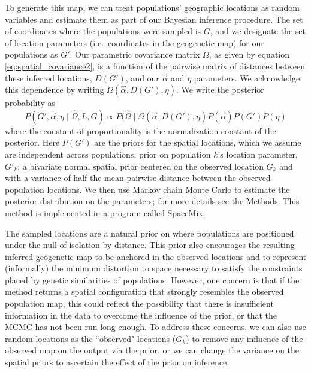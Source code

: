 \documentclass[12pt]{article}
\newcommand{\plrm}[1]{\todo[color=green!20]{#1}}
\newcommand{\plrm}[1]{\plr{#1}}
\newcommand{\plr}[1]{{\it\color{green}{(#1)}}}
\begin{document}
To generate this map, we can treat populations' geographic locations as random variables and estimate them as part of our Bayesian inference procedure.  The set of coordinates where the populations were sampled is $G$, and we designate the set of location parameters (i.e.\ coordinates in the geogenetic map) for our populations as $G'$. Our parametric covariance matrix $\Omega$, as given by equation \eqref{eq:spatial_covariance2}, is a function of the pairwise matrix of distances between these inferred locations, $D(G')$, and our $\vec{\alpha}$ and $\eta$ parameters.  We acknowledge this dependence by writing $\Omega(\vec{\alpha},{D}(G'),\eta)$.  We write the  posterior probability as 
\begin{equation}
\label{eq:cyol_prob}
P(G', \vec{\alpha}, \eta \mid \widehat{\Omega}, L, G) \propto  P(\widehat{\Omega}  \mid \Omega(\vec{\alpha},{D}(G'),\eta ) P(\vec{\alpha}) P(G') P(\eta) 
\end{equation}
where the constant of proportionality is the normalization constant of the posterior. Here $P(G') $ are the priors for the spatial locations,\plrm{distinguish from actual locations} which we assume are independent across populations.  \plr{We use a very weak} prior on population $k$'s location parameter, $G'_k$: a bivariate normal spatial prior centered on the observed location $G_k$ and with a variance of half the mean pairwise distance between the observed population locations. 
We then use Markov chain Monte Carlo to estimate the posterior distribution on the parameters; for more details see the Methods. 
This method is implemented in a program called SpaceMix. \plr{can we insert space-age sound effects whenever this name appears?}


The sampled locations are a natural prior on where populations are positioned under the null of isolation by distance.  %
This prior also encourages the resulting inferred geogenetic map to be anchored in the observed locations and to represent (informally) the minimum distortion to space necessary to satisfy the constraints placed by genetic similarities of populations. However, one concern is that if the method returns a spatial configuration that strongly resembles the observed population map, this could reflect the possibility that there is insufficient information in the data to overcome the influence of the prior, or that the MCMC has not been run long enough.  To address these concerns, we can also use random locations as the ``observed" locations ($G_k$) to remove any influence of the observed map on the output via the prior, or we can change the variance on the spatial priors to ascertain the effect of the prior on inference. 
\end{document}
